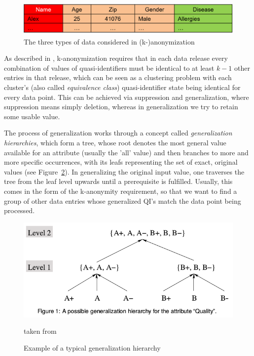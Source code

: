 \documentclass{llncs}
\begin{document}
\begin{figure}[!t]
	\begin{center}
		\includegraphics[width=\textwidth]{figures/anonym/3typesofdata}
		\caption{The three types of data considered in (k-)anonymization}
		\label{fig:anon_categories}
	\end{center}
\end{figure}

As described in \cite{ciriani2007kappa}, k-anonymization requires that in each data release every combination of values of quasi-identifiers must be identical to at least $k-1$ other entries in that release, which can be seen as a clustering problem with each cluster's (also called \textit{equivalence class}) quasi-identifier state being identical for every data point. This can be achieved via suppression and generalization, where suppression means simply deletion, whereas in generalization we try to retain some usable value.

The process of generalization works through a concept called \textit{generalization hierarchies}, which form a tree, whose root denotes the most general value available for an attribute (usually the 'all' value) and then branches to more and more specific occurrences, with its leafs representing the set of exact, original values (see Figure~\ref{fig:gen_hierarchy}). In generalizing the original input value, one traverses the tree from the leaf level upwards until a prerequisite is fulfilled. Usually, this comes in the form of the k-anonymity requirement, so that we want to find a group of other data entries whose generalized QI's match the data point being processed.

\begin{figure}[!t]
	\begin{center}
		\includegraphics[width=\textwidth]{figures/anonym/gen_hierarchy}
		\caption{Example of a typical generalization hierarchy}
		\label{fig:gen_hierarchy}
		\small
		taken from \cite{aggarwal2005approximation}
	\end{center}
\end{figure}
\end{document}
